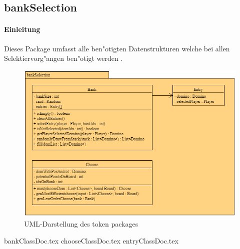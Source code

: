 \subsection{bankSelection}
\label{ss:bankSelection}
\FloatBarrier

\paragraph{Einleitung} 
Dieses Package umfasst alle ben"otigten Datenstrukturen welche bei allen Selektiervorg"angen ben"otigt werden . 

\begin{figure}
	\centering
	\includegraphics{pics/bankSelectionUMLPackage}
	\caption{UML-Darstellung des token packages}
	\label{fig:bankSelectionPackage}
\end{figure}

{bankClassDoc.tex}
{chooseClassDoc.tex}
{entryClassDoc.tex}